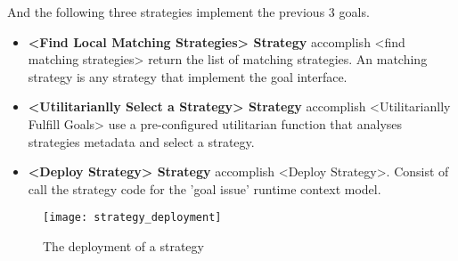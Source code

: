 And the following three strategies implement the previous 3 goals.

\begin{itemize}
  \item \textbf{<Find Local Matching Strategies> Strategy} accomplish <find matching strategies>
  return the list of matching strategies. An matching strategy is any strategy that implement the goal interface.

  \item \textbf{<Utilitarianlly Select a Strategy> Strategy} accomplish <Utilitarianlly Fulfill Goals>
  use a pre-configured utilitarian function that analyses strategies metadata and select a strategy.

  \item \textbf{<Deploy Strategy> Strategy} accomplish <Deploy Strategy>.
  Consist of call the strategy code for the 'goal issue' runtime context model.
\end{itemize}


\begin{figure}
  \centering
  \texttt{[image: strategy\_deployment]}
  \caption{The deployment of a strategy}
  \label{fig:agent_composition}
\end{figure}




